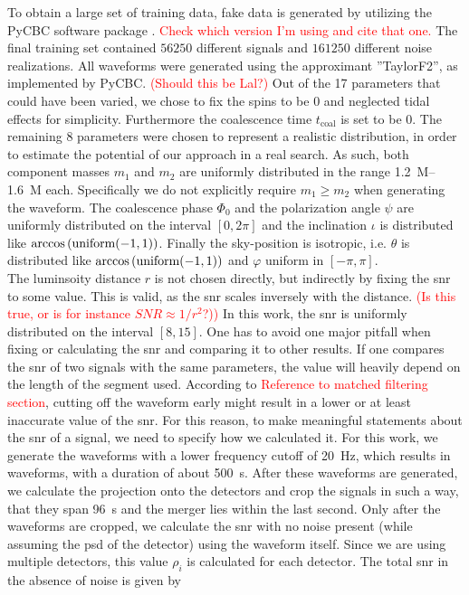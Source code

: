 To obtain a large set of training data, fake data is generated by utilizing the PyCBC software package \cite{pycbc}. \textcolor{red}{Check which version I'm using and cite that one.} The final training set contained $56250$ different signals and $161250$ different noise realizations. All waveforms were generated using the approximant ''TaylorF2'', as implemented by PyCBC. \textcolor{red}{(Should this be Lal?)} Out of the 17 parameters that could have been varied, we chose to fix the spins to be $0$ and neglected tidal effects for simplicity. Furthermore the coalescence time $t_\text{coal}$ is set to be $0$. The remaining $8$ parameters were chosen to represent a realistic distribution, in order to estimate the potential of our approach in a real search. As such, both component masses $m_1$ and $m_2$ are uniformly distributed in the range \SIrange{1.2}{1.6}{M_\odot} each. Specifically we do not explicitly require $m_1\geq m_2$ when generating the waveform. The coalescence phase $\Phi_0$  and the polarization angle $\psi$ are uniformly distributed on the interval $\left[0, 2\pi\right]$ and the inclination $\iota$ is distributed like $\arccos{\left( \text{uniform}{\left( -1, 1 \right)} \right)}$. Finally the sky-position is isotropic, i.e. $\theta$ is distributed like $\arccos{\left( \text{uniform}{\left( -1, 1 \right)} \right)}$ and $\varphi$ uniform in $\left[-\pi, \pi\right]$.\\
The luminsoity distance $r$ is not chosen directly, but indirectly by fixing the \gls{snr} to some value. This is valid, as the \gls{snr} scales inversely with the distance. \textcolor{red}{(Is this true, or is for instance $SNR\approx 1/r^2$?))} In this work, the \gls{snr} is uniformly distributed on the interval $\left[8,15\right]$. One has to avoid one major pitfall when fixing or calculating the \gls{snr} and comparing it to other results. If one compares the \gls{snr} of two signals with the same parameters, the value will heavily depend on the length of the segment used. According to \textcolor{red}{Reference to matched filtering section}, cutting off the waveform early might result in a lower or at least inaccurate value of the \gls{snr}. For this reason, to make meaningful statements about the \gls{snr} of a signal, we need to specify how we calculated it. For this work, we generate the waveforms with a lower frequency cutoff of \SI{20}{\hertz}, which results in waveforms, with a duration of about \SI{500}{\s}. After these waveforms are generated, we calculate the projection onto the detectors and crop the signals in such a way, that they span \SI{96}{\s} and the merger lies within the last second. Only after the waveforms are cropped, we calculate the \gls{snr} with no noise present (while assuming the \gls{psd} of the detector) using the waveform itself. Since we are using multiple detectors, this value $\rho_i$ is calculated for each detector. The total \gls{snr} in the absence of noise is given by

